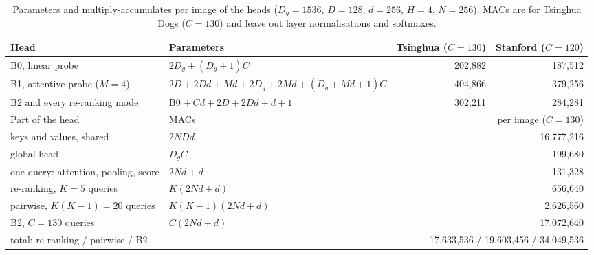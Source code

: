 \documentclass[11pt,a4paper]{article}
\theoremstyle{plain}
\begin{document}
\begin{table}[!htbp]
\centering
\caption{Parameters and multiply-accumulates per image of the heads ($D_g=1536$, $D=128$, $d=256$, $H=4$, $N=256$).
MACs are for Tsinghua Dogs ($C=130$) and leave out layer normalisations and softmaxes.}
\label{tab:complexity}
\small
\begin{adjustbox}{max width=\textwidth}
\begin{tabular}{@{}llrr@{}}
\toprule
Head & Parameters & Tsinghua ($C=130$) & Stanford ($C=120$)\\
\midrule
B0, linear probe & $2D_g+(D_g+1)C$ & 202,882 & 187,512\\
B1, attentive probe ($M=4$) & $2D+2Dd+Md+2D_g+2Md+(D_g+Md+1)C$ & 404,866 & 379,256\\
B2 and every re-ranking mode & B0 $+\,Cd+2D+2Dd+d+1$ & 302,211 & 284,281\\
\midrule
Part of the head & MACs & \multicolumn{2}{r}{per image ($C=130$)}\\
\midrule
keys and values, shared & $2NDd$ & \multicolumn{2}{r}{16,777,216}\\
global head & $D_gC$ & \multicolumn{2}{r}{199,680}\\
one query: attention, pooling, score & $2Nd+d$ & \multicolumn{2}{r}{131,328}\\
re-ranking, $K=5$ queries & $K(2Nd+d)$ & \multicolumn{2}{r}{656,640}\\
pairwise, $K(K-1)=20$ queries & $K(K-1)(2Nd+d)$ & \multicolumn{2}{r}{2,626,560}\\
B2, $C=130$ queries & $C(2Nd+d)$ & \multicolumn{2}{r}{17,072,640}\\
\midrule
total: re-ranking / pairwise / B2 & & \multicolumn{2}{r}{17,633,536 / 19,603,456 / 34,049,536}\\
\bottomrule
\end{tabular}
\end{adjustbox}
\end{table}
\end{document}
